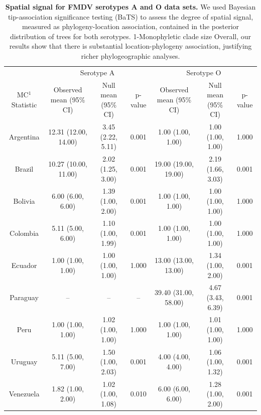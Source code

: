 \documentclass[a4paper,10pt]{article}
\begin{document}
\begin{table}
\caption{
\textbf{Spatial signal for FMDV serotypes A and O data sets.} We used Bayesian tip-association significance testing (BaTS) to assess the degree of spatial signal, measured as phylogeny-location association, contained in the posterior distribution of trees for both serotypes. 1-Monophyletic clade size
Overall, our results show that there is substantial location-phylogeny association, justifying richer phylogeographic analyses.}
\begin{tabular}{ccccccc}
\toprule
&\multicolumn{3}{c}{Serotype A} & \multicolumn{3}{c}{Serotype O} \\
MC$^1$ Statistic &Observed mean (95\% CI)&Null mean (95\% CI)&p-value &Observed mean (95\% CI)&Null mean (95\% CI)&p-value\\
\midrule
Argentina &12.31 (12.00, 14.00)	&3.45	(2.22, 5.11)	&0.001& 1.00 (1.00, 1.00)&	1.00 (1.00, 1.00)&	1.000\\
Brazil &10.27	(10.00, 11.00)	&2.02 (1.25, 3.00) &0.001& 19.00 (19.00, 19.00)&	2.19 (1.66, 3.03)&	0.001\\
Bolivia &6.00 (6.00, 6.00)	&1.39 (1.00, 2.00)	&0.001&1.00 (1.00, 1.00)&	1.00 (1.00, 1.00)&	1.000\\
Colombia &5.11 (5.00, 6.00)	&1.10  (1.00, 1.99)	&0.001&1.00 (1.00, 1.00)&	1.00 (1.00, 1.00)&	1.000\\
Ecuador &1.00 (1.00, 1.00)	&1.00 (1.00, 1.00)	&1.000&13.00 (13.00, 13.00)&	1.34 (1.00, 2.00)&	0.001\\
Paraguay&-- &-- &--  & 39.40 (31.00, 58.00)& 4.67 (3.43, 6.39)&0.001\\
Peru&1.00 (1.00, 1.00)	&1.02 (1.00, 1.00)&1.000&1.00 (1.00, 1.00)&1.01 (1.00, 1.00)&1.000\\
Uruguay &5.11 (5.00, 7.00)	&1.50	(1.00, 2.03)	&0.001&4.00 (4.00, 4.00)&	1.06 (1.00, 1.32)&	0.001\\
Venezuela&1.82 (1.00, 2.00)	&1.02 (1.00, 1.08)	&0.010&6.00 (6.00, 6.00)&	1.28 (1.00, 2.00)&	0.001\\
\bottomrule
\end{tabular}
\begin{flushleft}
\end{flushleft}
\label{stab:BaTS}
\end{table}
\end{document}
